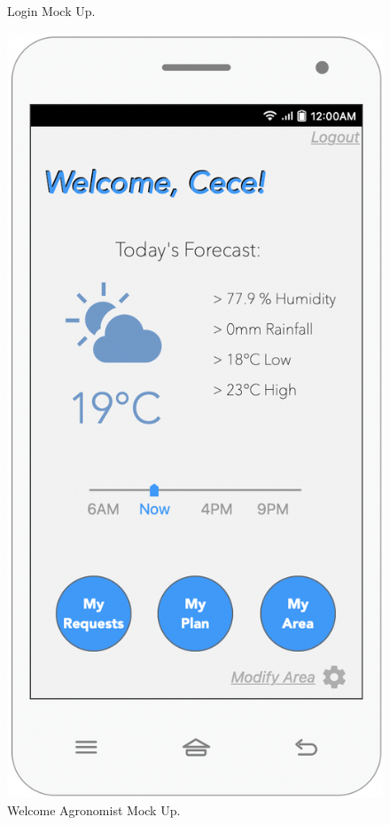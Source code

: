 \begin{multicols}{3}
\begin{figure}[H]
\caption{\label{fig:mock_login}Login Mock Up.}
\end{figure}


\begin{figure}[H]
\centering
\includegraphics[scale=0.35]{../images_diagrams/mock_ups/welcomeagro100.png}
\caption{\label{fig:mock_agronomist}Welcome Agronomist Mock Up.}
\end{figure}



\end{multicols}
